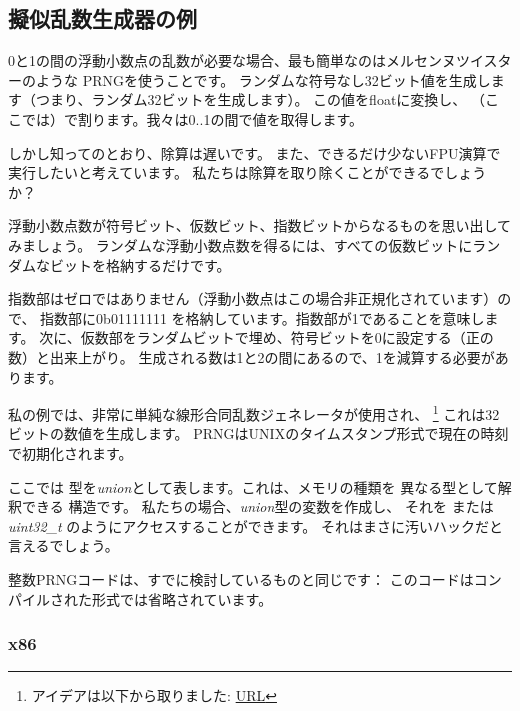\subsection{擬似乱数生成器の例}
\label{FPU_PRNG}

0と1の間の浮動小数点の乱数が必要な場合、最も簡単なのはメルセンヌツイスターのような
\ac{PRNG}を使うことです。
ランダムな符号なし32ビット値を生成します（つまり、ランダム32ビットを生成します）。
この値をfloatに変換し、
（ここでは）で割ります。我々は0..1の間で値を取得します。

しかし知ってのとおり、除算は遅いです。
また、できるだけ少ないFPU演算で実行したいと考えています。
私たちは除算を取り除くことができるでしょうか？


浮動小数点数が符号ビット、仮数ビット、指数ビットからなるものを思い出してみましょう。
ランダムな浮動小数点数を得るには、すべての仮数ビットにランダムなビットを格納するだけです。

指数部はゼロではありません（浮動小数点はこの場合非正規化されています）ので、
指数部に0b01111111
を格納しています。指数部が1であることを意味します。
次に、仮数部をランダムビットで埋め、符号ビットを0に設定する（正の数）と出来上がり。
生成される数は1と2の間にあるので、1を減算する必要があります。

\newcommand{\URLXOR}{\href{http://xor0110.wordpress.com/2010/09/24/how-to-generate-floating-point-random-numbers-efficiently/}{URL}}

私の例では、非常に単純な線形合同乱数ジェネレータが使用され、
\footnote{アイデアは以下から取りました: \URLXOR} これは32ビットの数値を生成します。 
\ac{PRNG}はUNIXのタイムスタンプ形式で現在の時刻で初期化されます。

ここでは \Tfloat 型を\emph{union}として表します。これは、メモリの種類を
異なる型として解釈できる \CCpp 構造です。
私たちの場合、\emph{union}型の変数を作成し、
それを \Tfloat  または \emph{uint32\_t} のようにアクセスすることができます。
それはまさに汚いハックだと言えるでしょう。


整数\ac{PRNG}コードは、すでに検討しているものと同じです：
このコードはコンパイルされた形式では省略されています。



\subsubsection{x86}

